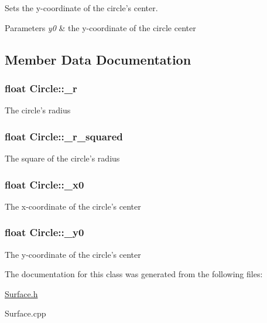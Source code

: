 Sets the y-\/coordinate of the circle's center. 


\begin{DoxyParams}{Parameters}
{\em y0} & the y-\/coordinate of the circle center \\
\hline
\end{DoxyParams}


\subsection{Member Data Documentation}
\hypertarget{classCircle_abe7a680302ea0124535814e97e952fb2}{
\subsubsection[{\-\_\-r}]{\setlength{\rightskip}{0pt plus 5cm}float Circle\-::\-\_\-r\hspace{0.3cm}{\ttfamily [protected]}}}\label{classCircle_abe7a680302ea0124535814e97e952fb2}
The circle's radius \hypertarget{classCircle_a3ecf4a7fff01cf51ee5416041f0695dc}{
\subsubsection[{\-\_\-r\-\_\-squared}]{\setlength{\rightskip}{0pt plus 5cm}float Circle\-::\-\_\-r\-\_\-squared\hspace{0.3cm}{\ttfamily [protected]}}}\label{classCircle_a3ecf4a7fff01cf51ee5416041f0695dc}
The square of the circle's radius \hypertarget{classCircle_a59739a0da9f81d73cf9b4c380f73320f}{
\subsubsection[{\-\_\-x0}]{\setlength{\rightskip}{0pt plus 5cm}float Circle\-::\-\_\-x0\hspace{0.3cm}{\ttfamily [protected]}}}\label{classCircle_a59739a0da9f81d73cf9b4c380f73320f}
The x-\/coordinate of the circle's center \hypertarget{classCircle_af69cb8c32169429fbe856e701ce14ab5}{
\subsubsection[{\-\_\-y0}]{\setlength{\rightskip}{0pt plus 5cm}float Circle\-::\-\_\-y0\hspace{0.3cm}{\ttfamily [protected]}}}\label{classCircle_af69cb8c32169429fbe856e701ce14ab5}
The y-\/coordinate of the circle's center 

The documentation for this class was generated from the following files\-:\begin{DoxyCompactItemize}
\item 
\hyperlink{Surface_8h}{Surface.\-h}\item 
Surface.\-cpp\end{DoxyCompactItemize}
